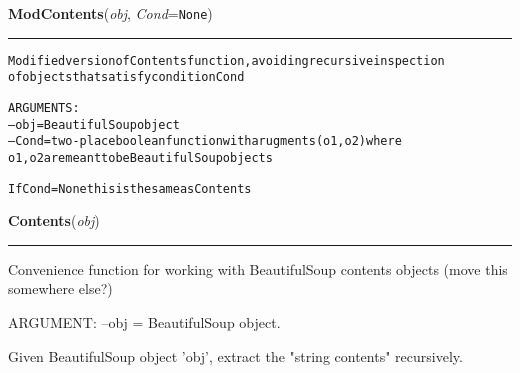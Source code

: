     \vspace{0.5ex}

\hspace{.8\funcindent}\begin{boxedminipage}{\funcwidth}

    \raggedright \textbf{ModContents}(\textit{obj}, \textit{Cond}={\tt None})

    \vspace{-1.5ex}

    \rule{\textwidth}{0.5\fboxrule}
\setlength{\parskip}{2ex}
\begin{alltt}

Modified version of Contents function, avoiding recursive inspection
of objects that satisfy condition Cond 

ARGUMENTS:
--obj = BeautifulSoup object
--Cond = two-place boolean function with arugments (o1,o2) where 
        o1,o2 are meant to be BeautifulSoup objects

If Cond = None this is the same as Contents 
\end{alltt}

\setlength{\parskip}{1ex}
    \end{boxedminipage}

    \label{System:Utils:Contents}

    \vspace{0.5ex}

\hspace{.8\funcindent}\begin{boxedminipage}{\funcwidth}

    \raggedright \textbf{Contents}(\textit{obj})

    \vspace{-1.5ex}

    \rule{\textwidth}{0.5\fboxrule}
\setlength{\parskip}{2ex}
    Convenience function for working with BeautifulSoup contents objects 
    (move this somewhere else?)

    ARGUMENT: --obj = BeautifulSoup object.

    Given BeautifulSoup object 'obj', extract the "string contents" 
    recursively.

\setlength{\parskip}{1ex}
    \end{boxedminipage}

    \label{System:Utils:fastisin}

